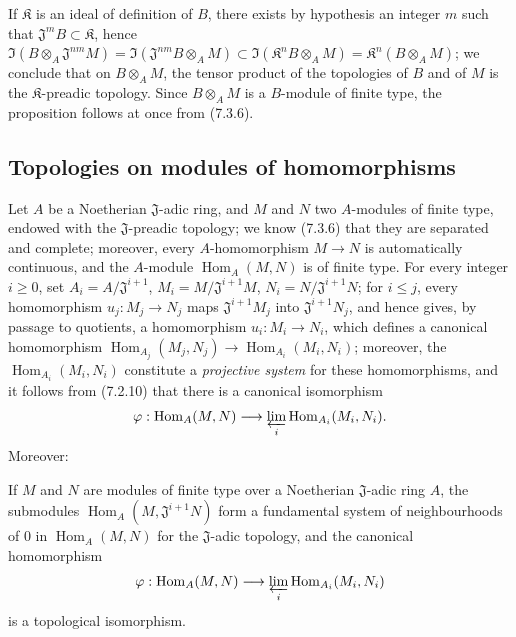 If $\mathfrak K$ is an ideal of definition of $B$, there exists by hypothesis
an integer $m$ such that $\mathfrak J^mB\subset\mathfrak K$, hence
$\Im(B\otimes_A\mathfrak J^{nm}M)=
\Im(\mathfrak J^{nm}B\otimes_A M)\subset
\Im(\mathfrak K^nB\otimes_A M)=\mathfrak K^n(B\otimes_A M)$; we
conclude that on $B\otimes_A M$, the tensor product of the topologies of $B$
and of $M$ is the $\mathfrak K$-preadic topology. Since $B\otimes_A M$
is a $B$-module of finite type, the proposition follows at once from (7.3.6).

\subsection{Topologies on modules of homomorphisms}
\label{subsection:0.7.8}

\begin{env}[7.8.1]
\label{0.7.8.1}
Let $A$ be a Noetherian $\mathfrak J$-adic ring, and $M$ and $N$ two
$A$-modules of finite type, endowed with the $\mathfrak J$-preadic topology;
we know (7.3.6) that they are separated and complete; moreover, every
$A$-homomorphism $M\to N$ is automatically continuous, and the $A$-module
$\operatorname{Hom}_A(M,N)$ is of finite type. For every integer $i\geq 0$, set
$A_i=A/\mathfrak J^{i+1}$, $M_i=M/\mathfrak J^{i+1}M$,
$N_i=N/\mathfrak J^{i+1}N$; for $i\leq j$, every homomorphism
$u_j:M_j\to N_j$ maps $\mathfrak J^{i+1}M_j$ into
$\mathfrak J^{i+1}N_j$, and hence gives, by passage to quotients, a
homomorphism $u_i:M_i\to N_i$, which defines a canonical homomorphism
$\operatorname{Hom}_{A_j}(M_j,N_j)\to\operatorname{Hom}_{A_i}(M_i,N_i)$; moreover, the
$\operatorname{Hom}_{A_i}(M_i,N_i)$ constitute a \emph{projective system} for these
homomorphisms, and it follows from (7.2.10) that there is a canonical
isomorphism
\[
  \varphi:\operatorname{Hom}_A(M,N)\longrightarrow
  \varprojlim_i\operatorname{Hom}_{A_i}(M_i,N_i).
\]
Moreover:
\end{env}

\begin{proposition}[7.8.2]
\label{0.7.8.2}
If $M$ and $N$ are modules of finite type over a Noetherian $\mathfrak J$-adic
ring $A$, the submodules $\operatorname{Hom}_A(M,\mathfrak J^{i+1}N)$ form a
fundamental system of neighbourhoods of $0$ in $\operatorname{Hom}_A(M,N)$ for the
$\mathfrak J$-adic topology, and the canonical homomorphism
\[
  \varphi:\operatorname{Hom}_A(M,N)\longrightarrow
  \varprojlim_i\operatorname{Hom}_{A_i}(M_i,N_i)
\]
is a topological isomorphism.
\end{proposition}

